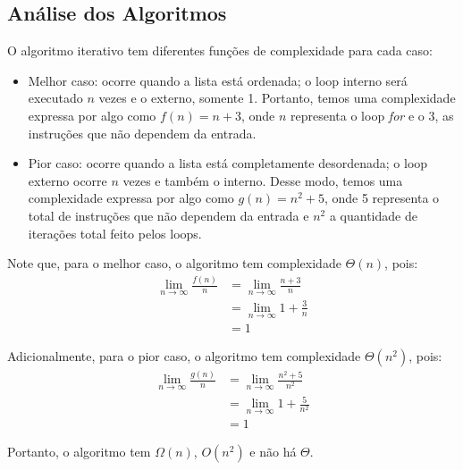 \subsection{Análise dos Algoritmos}
O algoritmo iterativo tem diferentes funções de complexidade para cada caso:
\begin{itemize}
  \item Melhor caso: ocorre quando a lista está ordenada; o loop interno será executado $n$ vezes e o externo, somente 1. Portanto, temos uma complexidade expressa por algo como $f(n) = n + 3$, onde $n$ representa o loop \textit{for} e o 3, as instruções que não dependem da entrada.
  \item Pior caso: ocorre quando a lista está completamente desordenada; o loop externo ocorre $n$ vezes e também o interno. Desse modo, temos uma complexidade expressa por algo como $g(n) = n^2 + 5$, onde 5 representa o total de instruções que não dependem da entrada e $n^2$ a quantidade de iterações total feito pelos loops.
\end{itemize}

Note que, para o melhor caso, o algoritmo tem complexidade $\Theta(n)$, pois:
\begin{align*}
    \lim_{n\to\infty} \frac{f(n)}{n} &= \lim_{n\to\infty} \frac{n + 3}{n} \\
    &= \lim_{n\to\infty} 1 + \frac{3}{n} \\ 
    &= 1 
\end{align*}

Adicionalmente, para o pior caso, o algoritmo tem complexidade $\Theta(n^2)$, pois:
\begin{align*}
    \lim_{n\to\infty} \frac{g(n)}{n} &= \lim_{n\to\infty} \frac{n^2 + 5}{n^2} \\
    &= \lim_{n\to\infty} 1 + \frac{5}{n^2} \\ 
    &= 1 
\end{align*}

Portanto, o algoritmo tem $\Omega(n)$, $O(n^2)$ e não há $\Theta$.

